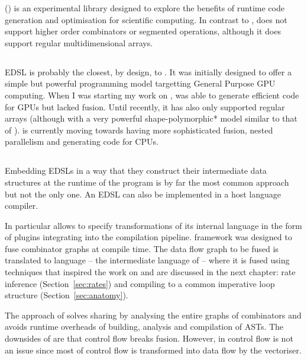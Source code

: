 \documentclass[preamble.tex]{subfiles}
\begin{document}
 () \cite{RMKB06} is an experimental  library designed to explore the benefits of runtime code generation and optimisation for scientific computing. In contrast to \DPH,  does not support higher order combinators or segmented operations, although it does support regular multidimensional arrays.


\subsection{}

 EDSL\iedsl \cite{CKL+11, McDonell:2013wi, CliftonEverest:2014vi} is probably the closest, by design, to \LiveFusion. It was initially designed to offer a simple but powerful programming model targetting General Purpose GPU computing. When I was starting my work on \LiveFusion,  was able to generate efficient code for GPUs but lacked fusion. Until recently, it has also only supported regular arrays (although with a very powerful \*shape-polymorphic* model similar to that of \Repa \cite{KCL+10}).  is currently moving towards having more sophisticated fusion, nested parallelism and generating code for CPUs.


\subsection{\FlowFusion}
\label{sec:Fronted-FlowFusion}

Embedding EDSLs in a way that they construct their intermediate data structures at the runtime of the program is by far the most common approach but not the only one. An EDSL can also be implemented in a host language compiler.

In particular \GHC allows to specify transformations of its internal  language in the form of plugins integrating into the compilation pipeline. \FlowFusion framework \cite{FlowFusion, FusingFiltersILP} was designed to fuse combinator graphs at compile time. The data flow graph to be fused is translated to  language -- the intermediate language of  \cite{DDC} -- where it is fused using  techniques that inspired the work on \LiveFusion and are discussed in the next chapter: rate inference (Section~\ref{sec:rates}) and compiling to a common imperative loop structure (Section~\ref{sec:anatomy}).

The approach of \FlowFusion solves sharing by analysing the entire graphs of combinators and avoids runtime overheads of building, analysis and compilation of ASTs. The downsides of \FlowFusion are that control flow breaks fusion. However, in \DPH control flow is not an issue since most of control flow is transformed into data flow by the vectoriser.
\end{document}
